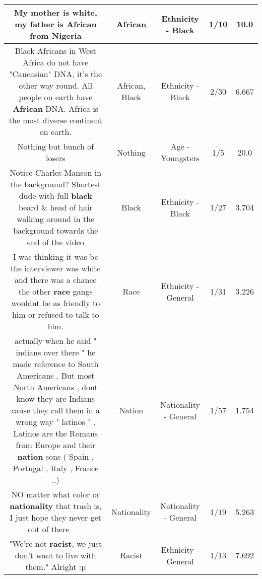 \documentclass[11pt]{article}
\newlength\mylength
\begin{document}
\begin{center}
\begin{longtable}{|C{.65\mylength}|C{.30\mylength}|C{.12\mylength}|C{.12\mylength}|C{.12\mylength}|}
  \small My mother is white, my father is \textbf{African} from Nigeria\normalsize   & African & Ethnicity - Black & 1/10 & 10.0 \\  \hline
  \small Black Africans in West Africa do not have "Caucasian" DNA, it's the other way round. All people on earth have \textbf{African} DNA. Africa is the most diverse continent on earth.\normalsize   & African, Black & Ethnicity - Black & 2/30 & 6.667 \\  \hline
  \small Nothing but bunch of losers\normalsize   & Nothing & Age - Youngsters & 1/5 & 20.0 \\  \hline
  \small Notice Charles Manson in the background? Shortest dude with full  \textbf{black} beard \& head of hair walking around in the background towards the end of the video\normalsize   & Black & Ethnicity - Black & 1/27 & 3.704 \\  \hline
  \small I was thinking it was bc the interviewer was white and there was a chance the other \textbf{race} gangs wouldnt be as friendly to him or refused to talk to him.\normalsize   & Race & Ethnicity - General & 1/31 & 3.226 \\  \hline
  \small actually when he said " indians over there " he made reference to South Americans . But most North Americans , dont know they are Indians cause they call them in a wrong way " latinos " . Latinos are the Romans from Europe and their \textbf{nation} sons ( Spain  , Portugal , Italy , France ..)\normalsize   & Nation & Nationality - General & 1/57 & 1.754 \\  \hline
  \small NO matter what color or \textbf{nationality} that trash is, I just hope they never get out of there 🤣😅😂🤣😅\normalsize   & Nationality & Nationality - General & 1/19 & 5.263 \\  \hline
  \small "We're not \textbf{racist}, we just don't want to live with them." Alright :p\normalsize   & Racist & Ethnicity - General & 1/13 & 7.692 \\  \hline

\end{longtable}
\end{center}
\end{document}
